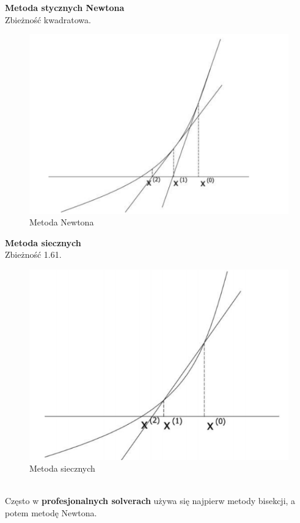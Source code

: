 \documentclass[12pt]{article}
\begin{document}
\textbf{Metoda stycznych Newtona}\\
Zbieżność kwadratowa.
\begin{figure}[H]
	\centering
	\includegraphics[scale=0.7]{Pictures/metoda_stycznych_newtona}
	\caption{Metoda Newtona}
\end{figure}

\textbf{Metoda siecznych}\\
Zbieżność 1.61.
\begin{figure}[H]
	\centering
	\includegraphics[scale=0.7]{Pictures/metoda_siecznych}
	\caption{Metoda siecznych}
\end{figure}
~\\
Często w \textbf{profesjonalnych solverach} używa się najpierw metody bisekcji, a potem metodę Newtona.
\end{document}
